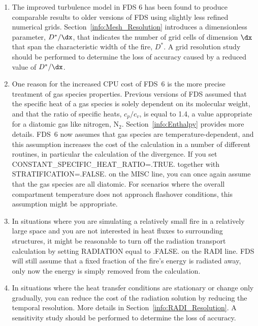 \documentclass[11pt]{book}
\begin{document}
\begin{enumerate}
\item The improved turbulence model in FDS 6 has been found to produce comparable results to older versions of FDS using slightly less refined numerical grids. Section~\ref{info:Mesh_Resolution} introduces a dimensionless parameter, $D^*/\dx$, that indicates the number of grid cells of dimension $\dx$ that span the characteristic width of the fire, $D^*$. A grid resolution study should be performed to determine the loss of accuracy caused by a reduced value of $D^*/\dx$.
\item One reason for the increased CPU cost of FDS~6 is the more precise treatment of gas species properties. Previous versions of FDS assumed that the specific heat of a gas species is solely dependent on its molecular weight, and that the ratio of specific heats, $c_p/c_v$, is equal to 1.4, a value appropriate for a diatomic gas like nitrogen, N$_2$. Section~\ref{info:Enthalpy} provides more details. FDS~6 now assumes that gas species are temperature-dependent, and this assumption increases the cost of the calculation in a number of different routines, in particular the calculation of the divergence. If you set {\ct CONSTANT\_SPECIFIC\_HEAT\_RATIO=.TRUE.} together with {\ct STRATIFICATION=.FALSE.} on the {\ct MISC} line, you can once again assume that the gas species are all diatomic. For scenarios where the overall compartment temperature does not approach flashover conditions, this assumption might be appropriate.
\item In situations where you are simulating a relatively small fire in a relatively large space and you are not interested in heat fluxes to surrounding structures, it might be reasonable to turn off the radiation transport calculation by setting {\ct RADIATION} equal to {\ct .FALSE.} on the {\ct RADI} line. FDS will still assume that a fixed fraction of the fire's energy is radiated away, only now the energy is simply removed from the calculation.
\item In situations where the heat transfer conditions are stationary or change only gradually, you can reduce the cost of the radiation solution by reducing the temporal resolution. More details in Section~\ref{info:RADI_Resolution}. A sensitivity study should be performed to determine the loss of accuracy.
\end{enumerate}
\end{document}
